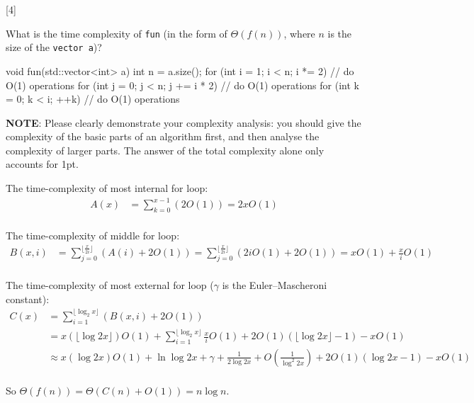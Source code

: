 [4]

What is the time complexity of \lstinline{fun} (in the form of \(\Theta(f(n))\), where \(n\) is the size of the \lstinline{vector a})?

\begin{cpp}
    void fun(std::vector<int> a) {
            int n = a.size();
            for (int i = 1; i < n; i *= 2) {
                    // do O(1) operations
                    for (int j = 0; j < n; j += i * 2) {
                            // do O(1) operations
                            for (int k = 0; k < i; ++k) {
                                    // do O(1) operations
                                }
                        }
                }
        }
\end{cpp}

\textbf{NOTE}: Please clearly demonstrate your complexity analysis: you should give the complexity of the basic parts of an algorithm first, and then analyse the complexity of larger parts. The answer of the total complexity alone only accounts for 1pt.

\begin{solution}

    The time-complexity of most internal for loop:
    \begin{align*}
        A(x) & = \sum_{k = 0}^{x - 1} (2O(1)) = 2xO(1) \\
    \end{align*}

    The time-complexity of middle for loop:
    \begin{align*}
        B(x, i) & = \sum_{j = 0}^{\lfloor \frac{x}{2i} \rfloor}(A(i) + 2O(1)) = \sum_{j = 0}^{\lfloor \frac{x}{2i} \rfloor}(2iO(1) + 2O(1))  = xO(1) + \frac{x}{i} O(1) \\
    \end{align*}

    The time-complexity of most external for loop ($\gamma$ is the Euler–Mascheroni constant):
    \begin{align*}
        C(x) & = \sum_{i = 1}^{\lfloor \log_2 x \rfloor} (B(x, i) + 2O(1))                                                                            \\
             & = x(\lfloor \log{2}{x} \rfloor)O(1) + \sum_{i = 1}^{\lfloor \log_2 x \rfloor}\frac{x}{i} O(1) + 2O(1)(\lfloor \log{2}{x} \rfloor - 1)  - xO(1) \\
             & \approx x( \log{2}{x} )O(1) + \ln \log{2}{x} + \gamma + \frac{1}{2\log{2}{x}} + O(\frac{1}{\log^2{2}{x}}) + 2O(1)( \log{2}{x}  - 1) - xO(1) \\
    \end{align*}

    So $\Theta(f(n)) = \Theta(C(n) + O(1)) = n\log{n}$.
\end{solution}